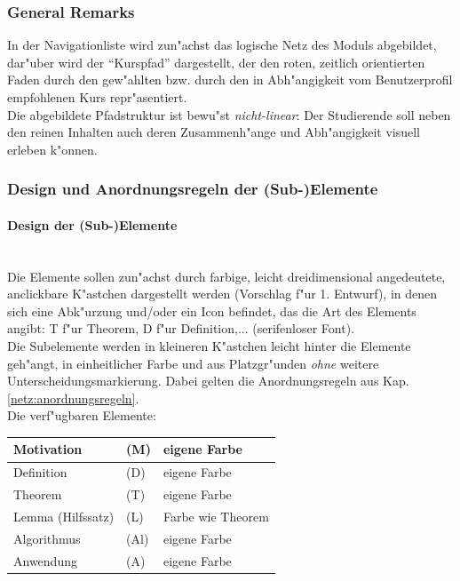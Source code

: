 \subsubsection{General Remarks}

In der Navigationliste wird zun"achst das logische Netz des Moduls
abgebildet, dar"uber wird der ``Kurspfad'' dargestellt, der den roten,
zeitlich orientierten Faden durch den gew"ahlten bzw. durch den in
Abh"angigkeit vom Benutzerprofil empfohlenen Kurs repr"asentiert.\\
Die abgebildete Pfadstruktur ist bewu"st \emph{nicht-linear}: Der Studierende
soll neben den reinen Inhalten auch deren Zusammenh"ange und Abh"angigkeit
visuell erleben k"onnen.


\subsubsection{Design und Anordnungsregeln der (Sub-)Elemente}

\paragraph{Design der (Sub-)Elemente}\mbox{ }\label{netz:design_sub_und_elemente}\\[-2ex]

Die Elemente sollen zun"achst durch farbige, leicht dreidimensional
angedeutete, anclickbare K"astchen dargestellt werden (Vorschlag f"ur
1. Entwurf), in denen sich eine Abk"urzung und/oder ein Icon befindet,
das die Art des Elements angibt: T f"ur Theorem, D f"ur Definition,...
(serifenloser Font).\\
Die Subelemente werden in kleineren K"astchen leicht hinter die Elemente
geh"angt, in einheitlicher Farbe und aus Platzgr"unden \textit{ohne} weitere
Unterscheidungsmarkierung. Dabei gelten die Anordnungsregeln aus
Kap. \ref{netz:anordnungsregeln}.\\

Die verf"ugbaren Elemente:
\begin{center}
\begin{tabular}{|l|l|l|}
\hline
Motivation              & (M)   & eigene Farbe          \\
\hline
\hline
Definition              & (D)   & eigene Farbe          \\
\hline
Theorem                 & (T)   & eigene Farbe          \\
\hline
Lemma (Hilfssatz)       & (L)   & Farbe wie Theorem     \\
\hline
Algorithmus             & (Al)  & eigene Farbe          \\
\hline
\hline
Anwendung               & (A)   & eigene Farbe          \\
\hline
\end{tabular}
\end{center}


